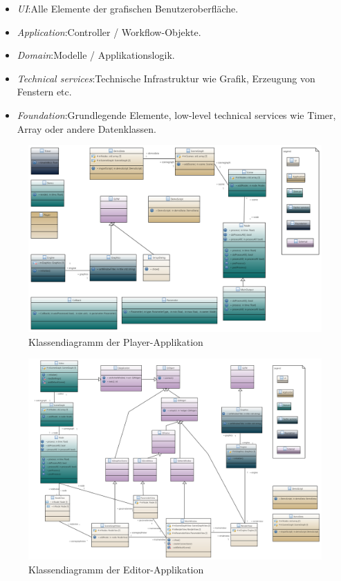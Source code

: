 \begin{itemize}
    \item[]
        \textit{UI}:\@ Alle Elemente der grafischen Benutzeroberfläche.
    \item[]
        \textit{Application}:\@ Controller / Workflow-Objekte.
    \item[]
        \textit{Domain}:\@ Modelle / Applikationslogik.
    \item[]
        \textit{Technical services}:\@ Technische Infrastruktur wie Grafik, Erzeugung von
        Fenstern etc.
    \item[]
        \textit{Foundation}:\@ Grundlegende Elemente, low-level technical services wie
        Timer, Array oder andere Datenklassen.
\end{itemize}

\begin{figure}[H]
    \centering
    \includegraphics[angle=90,width=1.0\textwidth]{img/player_class_diagram.png}
    \caption{Klassendiagramm der
        Player-Applikation}\label{fig:class-diagram:player}
\end{figure}

\begin{figure}[H]
    \centering
    \includegraphics[angle=90,width=1.1\textwidth]{img/editor_class_diagram.png}
    \caption{Klassendiagramm der
        Editor-Applikation}\label{fig:class-diagram:editor}
\end{figure}
